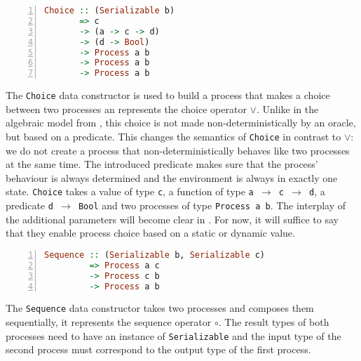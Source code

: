 \begin{lstlisting}[language=Haskell,caption=Signature of the \texttt{Choice} type constructor.,numbers=left,frame=bt]
Choice :: (Serializable b)
       => c
       -> (a -> c -> d)
       -> (d -> Bool)
       -> Process a b
       -> Process a b
       -> Process a b
\end{lstlisting}
The \texttt{Choice} data constructor is used to build a process that makes a choice between two processes an represents the choice operator $\vee$. Unlike in the algebraic model from , this choice is not made non-deterministically by an oracle, but based on a predicate. This changes the semantics of \texttt{Choice} in contrast to $\vee$: we do not create a process that non-deterministically behaves like two processes at the same time. The introduced predicate makes sure that the process' behaviour is always determined and the environment is always in exactly one state. \texttt{Choice} takes a value of type \texttt{c}, a function of type \texttt{a $\to$ c $\to$ d}, a predicate \texttt{d $\to$ Bool} and two processes of type \texttt{Process a b}. The interplay of the additional parameters will become clear in . For now, it will suffice to say that they enable process choice based on a static or dynamic value.

\begin{lstlisting}[language=Haskell,caption=Signature of the \texttt{Seqeuence} type constructor.,numbers=left,frame=bt]
Sequence :: (Serializable b, Serializable c)
         => Process a c
         -> Process c b
         -> Process a b
\end{lstlisting}
The \texttt{Sequence} data constructor takes two processes and composes them sequentially, it represents the sequence operator $\circ$. The result types of both processes need to have an instance of \texttt{Serializable} and the input type of the second process must correspond to the output type of the first process.

